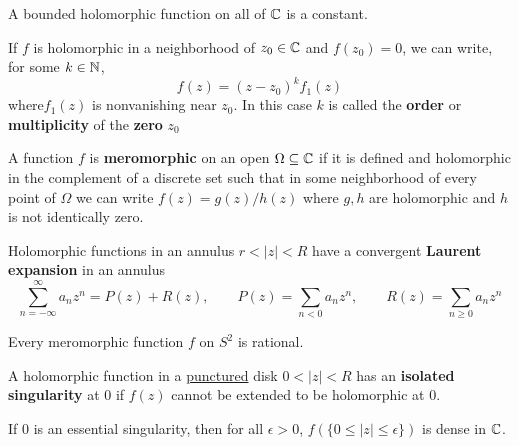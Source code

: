 \documentclass{article}
\begin{document}
\begin{theorem}
  A bounded holomorphic function on all of \(\mathbb{C}\) is a constant.
\end{theorem}

\begin{definition}[Zero]
If \(f\) is holomorphic in a neighborhood of \(z_0 \in \mathbb{C}\) and \(f(z_0) = 0\), we can write, for some \(k \in \mathbb{N}\),
\begin{equation}
  f(z) = (z - z_0)^kf_1(z)
\end{equation}
where\(f_1(z)\) is nonvanishing near \(z_0\). In this case \(k\) is called the \textbf{order} or \textbf{multiplicity} of the \textbf{zero} \(z_0\)
\end{definition}

\begin{definition}[Meromorphic]
  A function \(f\) is \textbf{meromorphic} on an open \(\Omega \subseteq \mathbb{C}\) if it is defined and holomorphic in the complement of a discrete set such that in some neighborhood of every point of \(\Omega\) we can write
  \(f(z) = g(z)/h(z)\)
  where \(g, h\) are holomorphic and \(h\) is not identically zero.
\end{definition}

\begin{definition}
Holomorphic functions in an annulus \(r < |z| < R\) have a convergent \textbf{Laurent expansion} in an annulus
\begin{equation}
  \sum_{n = -\infty}^\infty a_nz^n = P(z) + R(z), \qquad P(z) = \sum_{n < 0}a_nz^n, \qquad R(z) = \sum_{n \geq 0}a_nz^n
\end{equation}
\end{definition}

\begin{theorem}
  Every meromorphic function \(f\) on \(S^2\) is rational.
  \label{theorem:meromorphic_rational}
\end{theorem}

\begin{definition}
A holomorphic function in a \underline{punctured} disk \(0 < |z| < R\) has an \textbf{isolated singularity} at \(0\) if \(f(z)\) cannot be extended to be holomorphic at \(0\).
\end{definition}

\begin{theorem}
If \(0\) is an essential singularity, then for all \(\epsilon > 0\), \(f(\{0 \leq |z| \leq \epsilon\})\) is dense in \(\mathbb{C}\).
\end{theorem}
\end{document}
